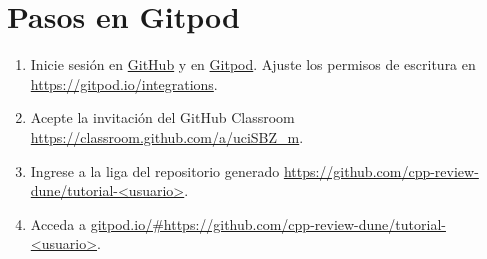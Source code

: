 \documentclass[9pt,a3paper]{scrartcl}
\begin{document}
\section*{\Huge Pasos en Gitpod}

\begin{enumerate}
	\item

	      Inicie sesión en \href{https://github.com/login}{GitHub} y en
	      \href{https://gitpod.io/login}{Gitpod}.
	      Ajuste los permisos de escritura en \url{https://gitpod.io/integrations}.

	\item

	      Acepte la invitación del GitHub Classroom
	      \url{https://classroom.github.com/a/uciSBZ_m}.

	\item

	      Ingrese a la liga del repositorio generado
	      \url{https://github.com/cpp-review-dune/tutorial-<usuario>}.

	\item

	      Acceda a
	      \url{gitpod.io/#https://github.com/cpp-review-dune/tutorial-<usuario>}.
\end{enumerate}

\vfill

\end{document}
